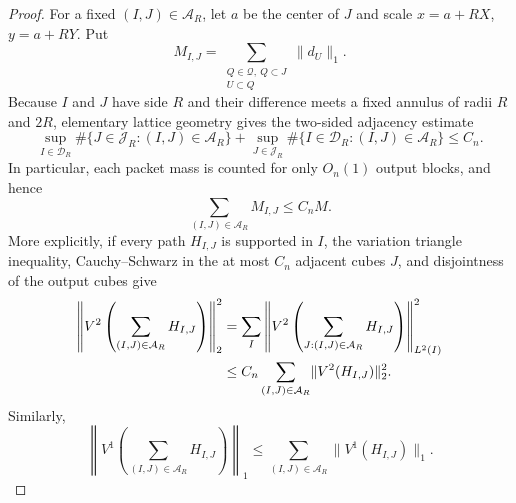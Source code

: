 \documentclass[11pt]{article}
\numberwithin{equation}{section}
\theoremstyle{remark}
\theoremstyle{definition}
\newcommand{\norm}[1]{\lVert #1\rVert}
\begin{document}
\begin{proof}
For a fixed $(I,J)\in\mathcal A_R$, let $a$ be the center of $J$ and scale
$x=a+RX$, $y=a+RY$.  Put
\[
 M_{I,J}=\sum_{\substack{Q\in\mathcal Q,\ Q\subset J\\U\subset Q}}
            \norm{d_U}_1.
\]
Because $I$ and $J$ have side $R$ and their difference meets a fixed
annulus of radii $R$ and $2R$, elementary lattice geometry gives the
two-sided adjacency estimate
\begin{equation}\label{eq:block-adjacency}
 \sup_{I\in\mathcal D_R}\#\{J\in\mathcal J_R:(I,J)\in\mathcal A_R\}
 +\sup_{J\in\mathcal J_R}\#\{I\in\mathcal D_R:(I,J)\in\mathcal A_R\}
 \le C_n.
\end{equation}
In particular, each packet mass is counted for only $O_n(1)$ output
blocks, and hence
\begin{equation}\label{eq:block-mass-overlap}
 \sum_{(I,J)\in\mathcal A_R}M_{I,J}\le C_nM.
\end{equation}
More explicitly, if every path $H_{I,J}$ is supported in $I$, the
variation triangle inequality, Cauchy--Schwarz in the at most $C_n$
adjacent cubes $J$, and disjointness of the output cubes give
\begin{align}
 \left\|V^2\left(\sum_{(I,J)\in\mathcal A_R}H_{I,J}\right)\right\|_2^2
 &=\sum_I\left\|V^2\left(
     \sum_{J:(I,J)\in\mathcal A_R}H_{I,J}\right)\right\|_{L^2(I)}^2
 \notag\\
 &\le C_n\sum_{(I,J)\in\mathcal A_R}
       \norm{V^2(H_{I,J})}_2^2.\label{eq:block-V2-overlap}
\end{align}
Similarly,
\begin{equation}\label{eq:block-V1-overlap}
 \left\|V^1\left(\sum_{(I,J)\in\mathcal A_R}H_{I,J}\right)\right\|_1
 \le\sum_{(I,J)\in\mathcal A_R}\norm{V^1(H_{I,J})}_1.
\end{equation}


\end{proof}
\end{document}

